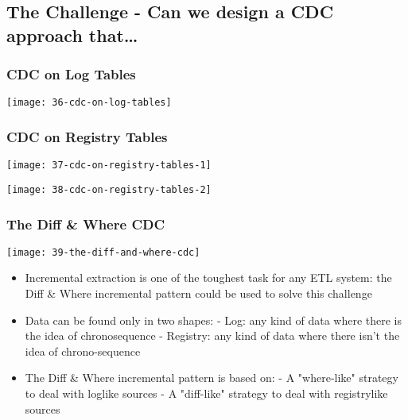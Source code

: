 \subsection{The Challenge - Can we design a CDC approach that…}

\subsubsection{CDC on Log Tables}

\begin{center}
\texttt{[image: 36-cdc-on-log-tables]}
\end{center}

\subsubsection{CDC on Registry Tables}

\begin{center}
\texttt{[image: 37-cdc-on-registry-tables-1]}
\end{center}

\hrulefill

\begin{center}
\texttt{[image: 38-cdc-on-registry-tables-2]}
\end{center}

\subsubsection{The Diff \& Where CDC}

\begin{center}
\texttt{[image: 39-the-diff-and-where-cdc]}
\end{center}

\begin{itemize}
	\item Incremental extraction is one of the toughest task for any ETL system: the Diff \& Where incremental pattern could be used to solve this challenge
	\item Data can be found only in two shapes:
		- Log: any kind of data where there is the idea of chronosequence
		- Registry: any kind of data where there isn’t the idea of chrono-sequence
	\item The Diff \& Where incremental pattern is based on:
		- A "where-like" strategy to deal with loglike sources
		- A "diff-like" strategy to deal with registrylike sources
\end{itemize}

